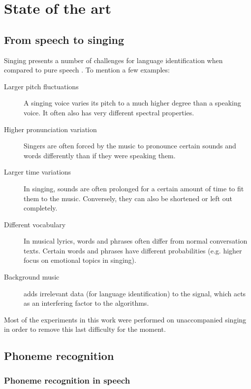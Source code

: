 \chapter{State of the art}	\label{chap:sota}
\section{From speech to singing}
Singing presents a number of challenges for language identification when compared to pure speech \cite{goto_alignment}. To mention a few examples:
\begin{description}
 \item[Larger pitch fluctuations] A singing voice varies its pitch to a much higher degree than a speaking voice. It often also has very different spectral properties.
 \item[Higher pronunciation variation] Singers are often forced by the music to pronounce certain sounds and words differently than if they were speaking them.
 \item[Larger time variations] In singing, sounds are often prolonged for a certain amount of time to fit them to the music. Conversely, they can also be shortened or left out completely.
 \item[Different vocabulary] In musical lyrics, words and phrases often differ from normal conversation texts. Certain words and phrases have different probabilities (e.g. higher focus on emotional topics in singing).
 \item[Background music] adds irrelevant data (for language identification) to the signal, which acts as an interfering factor to the algorithms. 
 \end{description}
Most of the experiments in this work were performed on unaccompanied singing in order to remove this last difficulty for the moment.

\section{Phoneme recognition}
\subsection{Phoneme recognition in speech}
